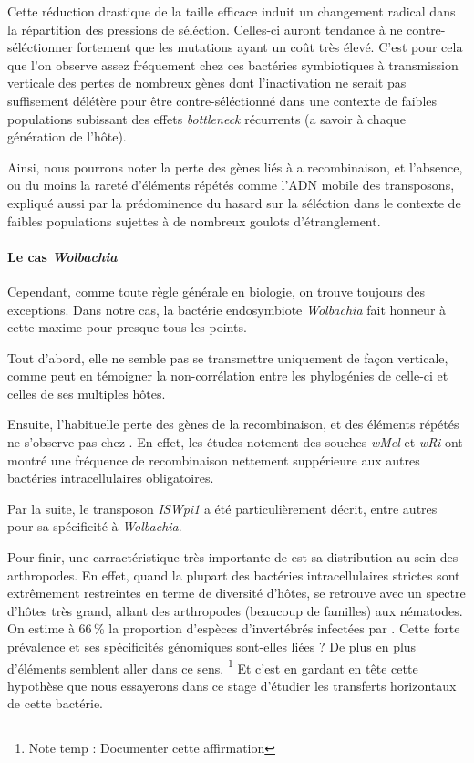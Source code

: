 Cette réduction drastique de la taille efficace induit un changement radical dans la répartition des pressions de séléction. Celles-ci auront tendance à ne contre-séléctionner fortement que les mutations ayant un coût très élevé.
C'est pour cela que l'on observe assez fréquement chez ces bactéries symbiotiques à transmission verticale des pertes de nombreux gènes\cite{wernegreen2002} dont  l'inactivation ne serait pas suffisement délétère pour être contre-séléctionné dans une contexte de faibles populations subissant des effets \textit{bottleneck} récurrents (a savoir à chaque génération de l'hôte).


Ainsi, nous pourrons noter la perte des gènes liés à a recombinaison, et l'absence, ou du moins la rareté d'éléments répétés comme l'ADN mobile des transposons, expliqué aussi par la prédominence du hasard sur la séléction dans le contexte de faibles populations sujettes à de nombreux goulots d’étranglement.

\paragraph{Le cas \textit{Wolbachia}\\}
Cependant, comme toute règle générale en biologie, on trouve toujours des exceptions. Dans notre cas, la bactérie endosymbiote \textit{Wolbachia} fait honneur à cette maxime pour presque tous les points. 

Tout d'abord, elle ne semble pas se transmettre uniquement de façon verticale, comme peut en témoigner la non-corrélation entre les phylogénies de celle-ci et celles de ses multiples hôtes\cite{vavre1999}.

Ensuite, l’habituelle perte des gènes de la recombinaison, et des éléments répétés ne s’observe pas chez . En effet, les études notement des souches \textit{wMel} et \textit{wRi} ont montré une fréquence de recombinaison nettement suppérieure aux autres bactéries intracellulaires obligatoires.

Par la suite, le transposon \textit{ISWpi1} a été particulièrement décrit\cite{Cordaux2008}, entre autres pour sa spécificité à \textit{Wolbachia}.%

Pour finir, une carractéristique très importante de  est sa distribution au sein des arthropodes. En effet, quand la plupart des bactéries intracellulaires strictes sont extrêmement restreintes en terme de diversité d'hôtes,  se retrouve avec un spectre d'hôtes très grand, allant des arthropodes (beaucoup de familles) aux nématodes. On estime à 66\,\% la proportion d'espèces d'invertébrés infectées par \cite{hilgenboecker2008}.
Cette forte prévalence et ses spécificités génomiques sont-elles liées ?
De plus en plus d'éléments semblent aller dans ce sens.%
\footnote{Note temp : Documenter cette affirmation}
Et c'est en gardant en tête cette hypothèse que nous essayerons dans ce stage d'étudier les transferts horizontaux de cette bactérie.

